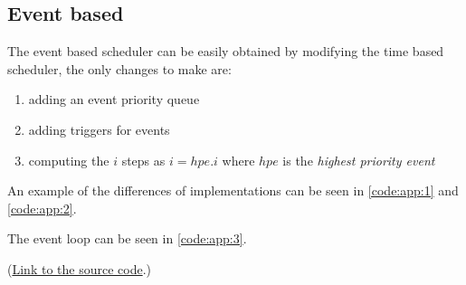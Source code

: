 \subsection{Event based}

The event based scheduler can be easily obtained by modifying the time based scheduler, the only changes to make are:
\begin{enumerate}
	\item adding an event priority queue
	\item adding triggers for events
	\item computing the $i$ steps as $i = hpe.i$ where $hpe$ is the \emph{highest priority event}
\end{enumerate}

An example of the differences of implementations can be seen in \ref{code:app:1} and \ref{code:app:2}.

The event loop can be seen in \ref{code:app:3}.


(\href{../h/os/llf_scheduler_event_based.h}{Link to the source code}.)